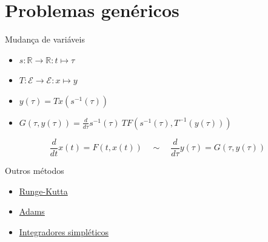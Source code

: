 \documentclass{beamer}
\begin{document}
\section{Problemas genéricos}

\begin{frame}[fragile]{Mudança de variáveis}
   \begin{itemize}
      \item $s:\mathbb R\rightarrow\mathbb R:t\mapsto \tau$
      \item $T:\mathcal E\rightarrow\mathcal E:x\mapsto y$
      \item $y(\tau) = Tx(s^{-1}(\tau))$
      \item $G(\tau, y(\tau)) =
      \frac{d}{d\tau} s^{-1}(\tau) ~ T F(s^{-1}(\tau), T^{-1}(y(\tau)))$
   \end{itemize}

   \begin{equation}
      \frac{d}{dt} x(t) = F(t, x(t))
      \quad\sim\quad
      \frac{d}{d\tau} y(\tau) = G(\tau, y(\tau))
   \end{equation}
\end{frame}

\begin{frame}{Outros métodos}
   \begin{itemize}
      \item \href{https://pt.wikipedia.org/wiki/Lista_de_m\%C3\%A9todos_Runge-Kutta}{Runge-Kutta}
      \item \href{https://pt.wikipedia.org/wiki/M\%C3\%A9todo_de_passo_m\%C3\%BAltiplo}{Adams}
      \item \href{https://pt.wikipedia.org/wiki/Integrador_simpl\%C3\%A9tico}{Integradores simpléticos}
   \end{itemize}
\end{frame}

\end{document}

